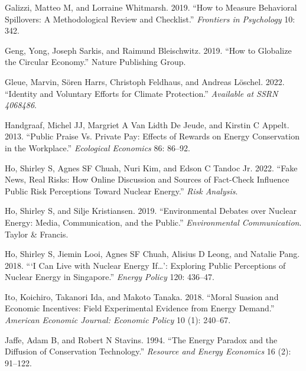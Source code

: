 \documentclass[
  12pt,
  captions=heading]{scrreport}
\newlength{\cslhangindent}
\newlength{\cslentryspacingunit} %
\newenvironment{CSLReferences}[2] %
 {%
  \setlength{\parindent}{0pt}
  \ifodd #1
  \let\oldpar\par
  \def\par{\hangindent=\cslhangindent\oldpar}
  \fi
  \setlength{\parskip}{#2\cslentryspacingunit}
 }%
 {}
\begin{document}
\begin{CSLReferences}{1}{0}
\leavevmode{}%
Galizzi, Matteo M, and Lorraine Whitmarsh. 2019. {``How to Measure
Behavioral Spillovers: A Methodological Review and Checklist.''}
\emph{Frontiers in Psychology} 10: 342.

\leavevmode{}%
Geng, Yong, Joseph Sarkis, and Raimund Bleischwitz. 2019. {``How to
Globalize the Circular Economy.''} Nature Publishing Group.

\leavevmode{}%
Gleue, Marvin, Sören Harrs, Christoph Feldhaus, and Andreas Löschel.
2022. {``Identity and Voluntary Efforts for Climate Protection.''}
\emph{Available at SSRN 4068486}.

\leavevmode{}%
Handgraaf, Michel JJ, Margriet A Van Lidth De Jeude, and Kirstin C
Appelt. 2013. {``Public Praise Vs. Private Pay: Effects of Rewards on
Energy Conservation in the Workplace.''} \emph{Ecological Economics} 86:
86--92.

\leavevmode{}%
Ho, Shirley S, Agnes SF Chuah, Nuri Kim, and Edson C Tandoc Jr. 2022.
{``Fake News, Real Risks: How Online Discussion and Sources of
Fact-Check Influence Public Risk Perceptions Toward Nuclear Energy.''}
\emph{Risk Analysis}.

\leavevmode{}%
Ho, Shirley S, and Silje Kristiansen. 2019. {``Environmental Debates
over Nuclear Energy: Media, Communication, and the Public.''}
\emph{Environmental Communication}. Taylor \& Francis.

\leavevmode{}%
Ho, Shirley S, Jiemin Looi, Agnes SF Chuah, Alisius D Leong, and Natalie
Pang. 2018. {``{`I Can Live with Nuclear Energy If{\ldots{}}'}:
Exploring Public Perceptions of Nuclear Energy in Singapore.''}
\emph{Energy Policy} 120: 436--47.

\leavevmode{}%
Ito, Koichiro, Takanori Ida, and Makoto Tanaka. 2018. {``Moral Suasion
and Economic Incentives: Field Experimental Evidence from Energy
Demand.''} \emph{American Economic Journal: Economic Policy} 10 (1):
240--67.

\leavevmode{}%
Jaffe, Adam B, and Robert N Stavins. 1994. {``The Energy Paradox and the
Diffusion of Conservation Technology.''} \emph{Resource and Energy
Economics} 16 (2): 91--122.


\end{CSLReferences}
\end{document}
